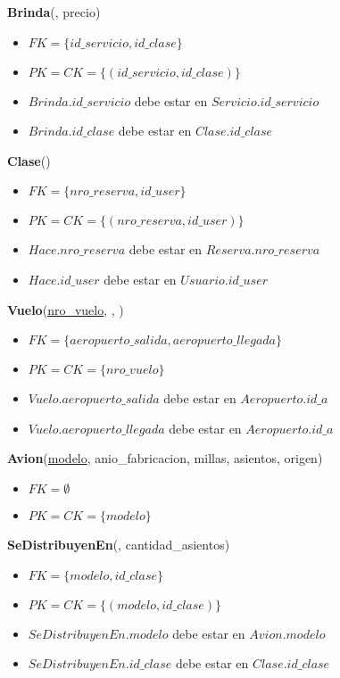\vspace*{0.1cm}
\noindent
\textbf{Brinda}(\underline{}, precio)
\begin{itemize}[noitemsep]
	\item $FK = \{id\_servicio, id\_clase\}$
	\item $PK = CK = \{(id\_servicio, id\_clase)\}$
	\item $Brinda.id\_servicio$ debe estar en $Servicio.id\_servicio$
	\item $Brinda.id\_clase$ debe estar en $Clase.id\_clase$
\end{itemize}

\vspace*{0.1cm}
\noindent
\textbf{Clase}(\underline{})
\begin{itemize}[noitemsep]
	\item $FK = \{nro\_reserva, id\_user\}$
	\item $PK = CK = \{(nro\_reserva, id\_user)\}$
	\item $Hace.nro\_reserva$ debe estar en $Reserva.nro\_reserva$
	\item $Hace.id\_user$ debe estar en $Usuario.id\_user$
\end{itemize}


\vspace*{0.1cm}
\noindent
\textbf{Vuelo}(\underline{nro\_vuelo}, ,
		)
\begin{itemize}[noitemsep]
	\item $FK = \{aeropuerto\_salida, aeropuerto\_llegada\}$
	\item $PK = CK = \{nro\_vuelo\}$
	\item $Vuelo.aeropuerto\_salida$ debe estar en $Aeropuerto.id\_a$
	\item $Vuelo.aeropuerto\_llegada$ debe estar en $Aeropuerto.id\_a$
\end{itemize}

\vspace*{0.1cm}
\noindent
\textbf{Avion}(\underline{modelo}, anio\_fabricacion, millas, asientos, origen)
\begin{itemize}[noitemsep]
	\item $FK = \emptyset$
	\item $PK = CK = \{modelo\}$
\end{itemize}

\vspace*{0.1cm}
\noindent
\textbf{SeDistribuyenEn}(\underline{},
	cantidad\_asientos)
\begin{itemize}[noitemsep]
	\item $FK = \{modelo, id\_clase\}$
	\item $PK = CK = \{(modelo, id\_clase)\}$
	\item $SeDistribuyenEn.modelo$ debe estar en $Avion.modelo$
	\item $SeDistribuyenEn.id\_clase$ debe estar en $Clase.id\_clase$
\end{itemize}

